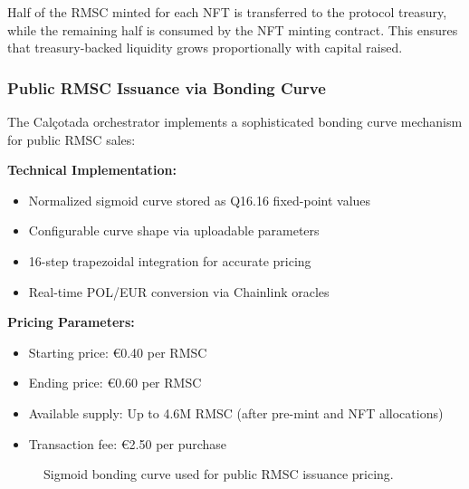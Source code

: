 \documentclass[conference]{IEEEtran}
\begin{document}
Half of the RMSC minted for each NFT is transferred to the protocol treasury, while the remaining half is consumed by the NFT minting contract. This ensures that treasury-backed liquidity grows proportionally with capital raised.

\subsubsection{Public RMSC Issuance via Bonding Curve}

The Calçotada orchestrator implements a sophisticated bonding curve mechanism for public RMSC sales:

\textbf{Technical Implementation:}
\begin{itemize}
    \item Normalized sigmoid curve stored as Q16.16 fixed-point values
    \item Configurable curve shape via uploadable parameters
    \item 16-step trapezoidal integration for accurate pricing
    \item Real-time POL/EUR conversion via Chainlink oracles
\end{itemize}

\textbf{Pricing Parameters:}
\begin{itemize}
    \item Starting price: €0.40 per RMSC
    \item Ending price: €0.60 per RMSC  
    \item Available supply: Up to 4.6M RMSC (after pre-mint and NFT allocations)
    \item Transaction fee: €2.50 per purchase
\end{itemize}
\begin{figure}[ht]
\centering
{}
\caption{Sigmoid bonding curve used for public RMSC issuance pricing.}
\label{fig:sigmoidcurve}
\end{figure}
\end{document}
